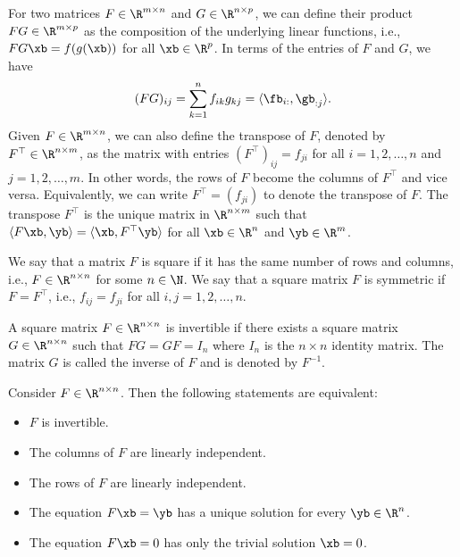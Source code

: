 For two matrices $F \in \R^{m \times n}$ and $G \in \R^{n \times p}$, we can define their product $FG \in \R^{m \times p}$ as the composition of the underlying linear functions, i.e., $FG \xb = f(g(\xb))$ for all $\xb \in \R^p$. In terms of the entries of $F$ and $G$, we have
\begin{equation*}
    (FG)_{ij} = \sum_{k=1}^n f_{ik} g_{kj} = \langle \fb_{i:}, \gb_{:j} \rangle.
\end{equation*}
Given $F \in \R^{m \times n}$, we can also define the transpose of $F$, denoted by $F^\top \in \R^{n \times m}$, as the matrix with entries $(F^\top)_{ij} = f_{ji}$ for all $i=1,2,\ldots,n$ and $j=1,2,\ldots,m$. In other words, the rows of $F$ become the columns of $F^\top$ and vice versa. Equivalently, we can write $F^\top = (f_{ji})$ to denote the transpose of $F$. The transpose $F^\top$ is the unique matrix in $\R^{n \times m}$ such that $\langle F \xb, \yb \rangle = \langle \xb, F^\top \yb \rangle$ for all $\xb \in \R^n$ and $\yb \in \R^m$.

\begin{definition}
    We say that a matrix $F$ is square if it has the same number of rows and columns, i.e., $F \in \R^{n \times n}$ for some $n \in \N$. We say that a square matrix $F$ is 
    symmetric if $F = F^\top$, i.e., $f_{ij} = f_{ji}$ for all $i,j=1,2,\ldots,n$.
\end{definition}

\begin{definition}
    A square matrix $F \in \R^{n \times n}$ is invertible if there exists a square matrix $G \in \R^{n \times n}$ such that $FG = GF = I_n$ where $I_n$ is the $n \times n$ identity matrix. The matrix $G$ is called the inverse of $F$ and is denoted by $F^{-1}$.
\end{definition}

\begin{lemma}
    Consider $F \in \R^{n \times n}$. Then the following statements are equivalent:

    \begin{itemize}
        \item $F$ is invertible.
        \item The columns of $F$ are linearly independent.
        \item The rows of $F$ are linearly independent.
        \item The equation $F \xb = \yb$ has a unique solution for every $\yb \in \R^n$.
        \item The equation $F \xb = 0$ has only the trivial solution $\xb = 0$.
    \end{itemize}
\end{lemma}

